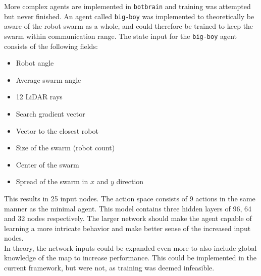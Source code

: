 More complex agents are implemented in \texttt{botbrain} and training was attempted but never finished. An agent called \texttt{big-boy} was implemented to theoretically be aware of the robot swarm as a whole, and could therefore be trained to keep the swarm within communication range. The state input for the \texttt{big-boy} agent consists of the following fields:

\begin{itemize}
    \item Robot angle
    \item Average swarm angle
    \item 12 LiDAR rays
    \item Search gradient vector
    \item Vector to the closest robot
    \item Size of the swarm (robot count)
    \item Center of the swarm
    \item Spread of the swarm in $x$ and $y$ direction
\end{itemize}

This results in 25 input nodes. The action space consists of 9 actions in the same manner as the minimal agent. This model contains three hidden layers of 96, 64 and 32 nodes respectively. The larger network should make the agent capable of learning a more intricate behavior and make better sense of the increased input nodes. \\

In theory, the network inputs could be expanded even more to also include global knowledge of the map to increase performance. This could be implemented in the current framework, but were not, as training was deemed infeasible.
